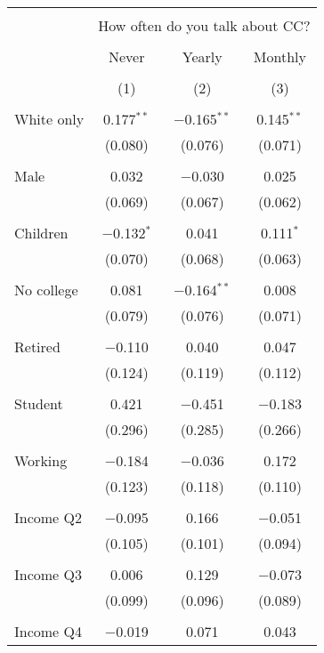
\begin{tabular}{@{\extracolsep{5pt}}lccc} 
\\[-1.8ex]\hline 
\hline \\[-1.8ex] 
 & \multicolumn{3}{c}{How often do you talk about CC?} \\ 
\cline{2-4} 
\\[-1.8ex] & Never & Yearly & Monthly \\ 
\\[-1.8ex] & (1) & (2) & (3)\\ 
\hline \\[-1.8ex] 
 White only & 0.177$^{**}$ & $-$0.165$^{**}$ & 0.145$^{**}$ \\ 
  & (0.080) & (0.076) & (0.071) \\ 
  & & & \\ 
 Male & 0.032 & $-$0.030 & 0.025 \\ 
  & (0.069) & (0.067) & (0.062) \\ 
  & & & \\ 
 Children & $-$0.132$^{*}$ & 0.041 & 0.111$^{*}$ \\ 
  & (0.070) & (0.068) & (0.063) \\ 
  & & & \\ 
 No college & 0.081 & $-$0.164$^{**}$ & 0.008 \\ 
  & (0.079) & (0.076) & (0.071) \\ 
  & & & \\ 
 Retired & $-$0.110 & 0.040 & 0.047 \\ 
  & (0.124) & (0.119) & (0.112) \\ 
  & & & \\ 
 Student & 0.421 & $-$0.451 & $-$0.183 \\ 
  & (0.296) & (0.285) & (0.266) \\ 
  & & & \\ 
 Working & $-$0.184 & $-$0.036 & 0.172 \\ 
  & (0.123) & (0.118) & (0.110) \\ 
  & & & \\ 
 Income Q2 & $-$0.095 & 0.166 & $-$0.051 \\ 
  & (0.105) & (0.101) & (0.094) \\ 
  & & & \\ 
 Income Q3 & 0.006 & 0.129 & $-$0.073 \\ 
  & (0.099) & (0.096) & (0.089) \\ 
  & & & \\ 
 Income Q4 & $-$0.019 & 0.071 & 0.043 \\ 

\end{tabular}
